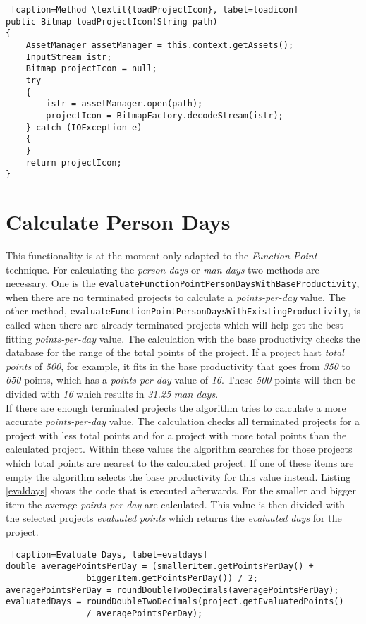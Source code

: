 \begin{lstlisting} [caption=Method \textit{loadProjectIcon}, label=loadicon] 
public Bitmap loadProjectIcon(String path)
{
	AssetManager assetManager = this.context.getAssets();
	InputStream istr;
	Bitmap projectIcon = null;
	try
	{
		istr = assetManager.open(path);
		projectIcon = BitmapFactory.decodeStream(istr);
	} catch (IOException e)
	{
	}
	return projectIcon;
}
\end{lstlisting}
\section{Calculate Person Days}

This functionality is at the moment only adapted to the \textit{Function Point} technique. For calculating the \textit{person days} or \textit{man days} two methods are necessary. One is the \texttt{evaluateFunctionPointPersonDaysWithBaseProductivity}, when there are no terminated projects to calculate a \textit{points-per-day} value. The other method, \texttt{evaluateFunctionPointPersonDaysWithExistingProductivity}, is called when there are already terminated projects which will help get the best fitting \textit{points-per-day} value. The calculation with the base productivity checks the database for the range of the total points of the project. If a project hast \textit{total points} of \textit{500}, for example, it fits in the base productivity that goes from \textit{350} to \textit{650} points, which has a \textit{points-per-day} value of \textit{16}. These \textit{500} points will then be divided with \textit{16} which results in \textit{31.25} \textit{man days}.\\
If there are enough terminated projects the algorithm tries to calculate a more accurate \textit{points-per-day} value. The calculation checks all terminated projects for a project with less total points and for a project with more total points than the calculated project. Within these values the algorithm searches for those projects which total points are nearest to the calculated project. If one of these items are empty the algorithm selects the base productivity for this value instead. Listing \ref{evaldays} shows the code that is executed afterwards. For the smaller and bigger item the average \textit{points-per-day} are calculated. This value is then divided with the selected projects \textit{evaluated points} which returns the \textit{evaluated days} for the project.
\begin{lstlisting} [caption=Evaluate Days, label=evaldays] 
double averagePointsPerDay = (smallerItem.getPointsPerDay() + 
				biggerItem.getPointsPerDay()) / 2;
averagePointsPerDay = roundDoubleTwoDecimals(averagePointsPerDay);
evaluatedDays = roundDoubleTwoDecimals(project.getEvaluatedPoints() 
				/ averagePointsPerDay);
\end{lstlisting}

